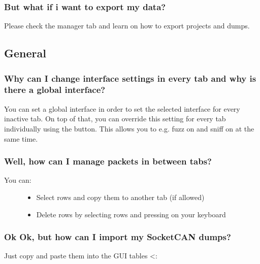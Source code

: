 \documentclass[letterpaper,10pt,english]{sphinxmanual}
\begin{document}
\subsubsection{But what if i want to export my data?}
\label{\detokenize{manual.maintab:but-what-if-i-want-to-export-my-data}}
Please check the manager tab and learn on how to export projects and
dumps.


\subsection{General}
\label{\detokenize{manual.general::doc}}\label{\detokenize{manual.general:general}}

\subsubsection{Why can I change interface settings in every tab and why is there a global interface?}
\label{\detokenize{manual.general:why-can-i-change-interface-settings-in-every-tab-and-why-is-there-a-global-interface}}
You can set a global interface in order to set the selected interface
for every inactive tab. On top of that, you can override this setting
for every tab individually using the button. This allows you to e.g.
fuzz on  and sniff on  at the same time.


\subsubsection{Well, how can I manage packets in between tabs?}
\label{\detokenize{manual.general:well-how-can-i-manage-packets-in-between-tabs}}\begin{description}
\item[{You can:}] \leavevmode\begin{itemize}
\item {} 
Select rows and copy them to another tab (if allowed)

\item {} 
Delete rows by selecting rows and pressing  on your keyboard

\end{itemize}

\end{description}


\subsubsection{Ok Ok, but how can I import my SocketCAN dumps?}
\label{\detokenize{manual.general:ok-ok-but-how-can-i-import-my-socketcan-dumps}}
Just copy and paste them into the GUI tables \textless{}:
\end{document}

